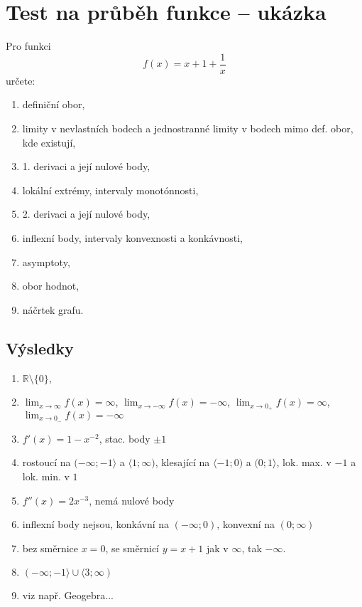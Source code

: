 \documentclass[12pt,a4paper]{article}
\def\R{\mathbb R}
\theoremstyle{definition}
\begin{document}
\section*{Test na průběh funkce -- ukázka}

Pro funkci
\[ f(x) = x + 1 + \frac{1}{x} \]
určete:
\begin{enumerate}
	\item definiční obor,
	\item limity v nevlastních bodech a jednostranné limity v bodech mimo def. obor, kde existují,
	\item 1. derivaci a její nulové body,
	\item lokální extrémy, intervaly monotónnosti,
	\item 2. derivaci a její nulové body,
	\item inflexní body, intervaly konvexnosti a konkávnosti,
	\item asymptoty,
	\item obor hodnot,
	\item náčrtek grafu.
\end{enumerate}




\newpage

\subsection*{Výsledky}

\begin{enumerate}
	\everymath{\displaystyle}
	\item $\R \setminus \{0\}$,
	\item $\lim_{x \to \infty} f(x) = \infty$, $\lim_{x \to -\infty} f(x) = -\infty$, $\lim_{x \to 0_+} f(x) = \infty$, $\lim_{x \to 0_-} f(x) = -\infty$
	\item $f'(x) = 1 - x^{-2}$, stac. body $\pm 1$
	\item rostoucí na $(-\infty; -1\rangle$ a $\langle1; \infty)$, klesající na $\langle-1; 0)$ a $(0; 1\rangle$, lok. max. v $-1$ a lok. min. v $1$
	\item $f''(x) = 2x^{-3}$, nemá nulové body
	\item inflexní body nejsou, konkávní na $(-\infty; 0)$, konvexní na $(0; \infty)$
	\item bez směrnice $x = 0$, se směrnicí $y = x+1$ jak v $\infty$, tak $-\infty$.
	\item $(-\infty; -1\rangle \cup \langle 3; \infty)$
	\item viz např. Geogebra...
\end{enumerate}
\end{document}
